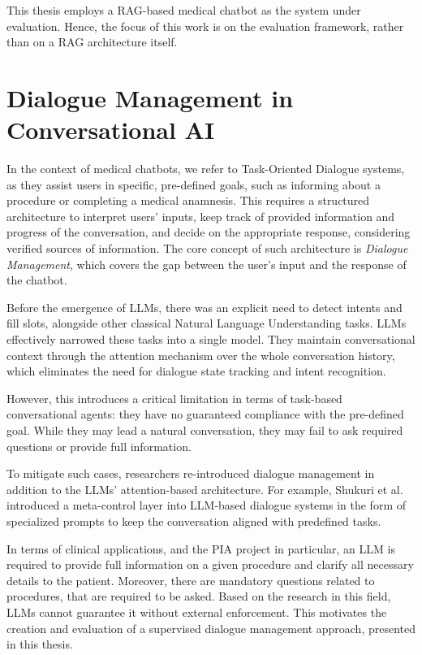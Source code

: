 This thesis employs a RAG-based medical chatbot as the system under evaluation. Hence, the focus of this work is on the evaluation framework, rather than on a RAG architecture itself.

\section{Dialogue Management in Conversational AI}

In the context of medical chatbots, we refer to Task-Oriented Dialogue systems, as they assist users in specific, pre-defined goals, such as informing about a procedure or completing a medical anamnesis.
This requires a structured architecture to interpret users' inputs, keep track of provided information and progress of the conversation, and decide on the appropriate response, considering verified sources of information.
The core concept of such architecture is \textit{Dialogue Management}, which covers the gap between the user's input and the response of the chatbot.

Before the emergence of LLMs, there was an explicit need to detect intents and fill slots, alongside other classical Natural Language Understanding tasks. LLMs effectively narrowed these tasks into a single model.
They maintain conversational context through the attention mechanism over the whole conversation history, which eliminates the need for dialogue state tracking and intent recognition.

However, this introduces a critical limitation in terms of task-based conversational agents: they have no guaranteed compliance with the pre-defined goal.
While they may lead a natural conversation, they may fail to ask required questions or provide full information.

To mitigate such cases, researchers re-introduced dialogue management in addition to the LLMs' attention-based architecture. For example, Shukuri et al.\cite{shukuriMetacontrolDialogueSystems2023} introduced a meta-control layer into LLM-based dialogue systems in the form of specialized prompts to keep the conversation aligned with predefined tasks.

In terms of clinical applications, and the PIA project in particular, an LLM is required to provide full information on a given procedure and clarify all necessary details to the patient. 
Moreover, there are mandatory questions related to procedures, that are required to be asked.
Based on the research in this field, LLMs cannot guarantee it without external enforcement\cite{hudecekAreLargeLanguage2023}.
This motivates the creation and evaluation of a supervised dialogue management approach, presented in this thesis.

